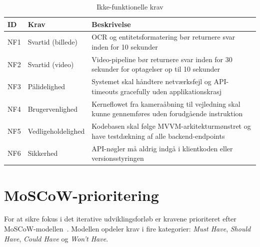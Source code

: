 \begin{table}[H]
  \centering
  \caption{Ikke-funktionelle krav}
  \label{tab:ikke-funktionelle-krav}
  \begin{tabularx}{\textwidth}{@{}llX@{}}
    \toprule
    \textbf{ID} & \textbf{Krav} & \textbf{Beskrivelse} \\
    \midrule
    NF1 & Svartid (billede) & OCR og entitetsformatering bør returnere svar inden for 10 sekunder \\
    \addlinespace
    NF2 & Svartid (video)   & Video-pipeline bør returnere svar inden for 30 sekunder for optagelser op til 10 sekunder \\
    \addlinespace
    NF3 & Pålidelighed      & Systemet skal håndtere netværksfejl og API-timeouts gracefully uden applikationskrasj \\
    \addlinespace
    NF4 & Brugervenlighed   & Kerneflowet fra kameraåbning til vejledning skal kunne gennemføres uden forudgående instruktion \\
    \addlinespace
    NF5 & Vedligeholdelighed & Kodebasen skal følge MVVM-arkitekturmønstret og have testdækning af alle backend-endpoints \\
    \addlinespace
    NF6 & Sikkerhed         & API-nøgler må aldrig indgå i klientkoden eller versionsstyringen \\
    \bottomrule
  \end{tabularx}
\end{table}

\section{MoSCoW-prioritering}
\label{sec:moscow}

For at sikre fokus i det iterative udviklingsforløb er kravene prioriteret efter MoSCoW-modellen~\cite{moscow}. Modellen opdeler krav i fire kategorier: \textit{Must Have}, \textit{Should Have}, \textit{Could Have} og \textit{Won't Have}.

